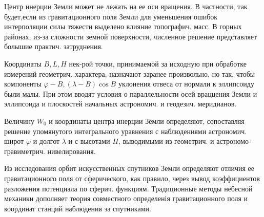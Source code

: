\documentclass[10pt]{article}
\begin{document}
Центр инерции Земли может не лежать на ее оси вращения. В частности, так будет,если из гравитационного поля Земли для уменьшения ошибок интерполяции силы тяжести выделено влияние топографич. масс. В горных районах, из-за сложности земной поверхности, численное решение представляет болышие практич. затруднения.



Координаты $B, L, H$ нек-рой точки, принимаемой за исходную при обработке измерений геометрич. характера, назначают заранее произвольно, но так, чтобы компоненты $\varphi-B,(\lambda-B) \cos B$ уклонения отвеса от нормали к эллипсоиду были малы. При этом вводят условия о параллельности осей враццения Земли и эллипсоида и плоскостей начальных астрономич. и геодезич. меридианов.



Величину $W_{0}$ и координаты центра инерции Земли определяют, сопоставляя решение упомянутого интегрального уравнения с наблюдениями астрономич. широт $\varphi$ и долгот $\lambda$ и с высотами $H$, выводимыми из геометрич. и астрономо-гравиметрич. нивелирования.



Из исследования орбит искусственных спутников Земли определяют отличия ее гравитационного поля от сферического, как правило, через вывод коэффициентов разложения потенциала по сферич. функциям. Традиционные методы небесной механики дополняет теория совместного определенія гравитационного поля и координат станций наблюдения за спутниками.
\end{document}
